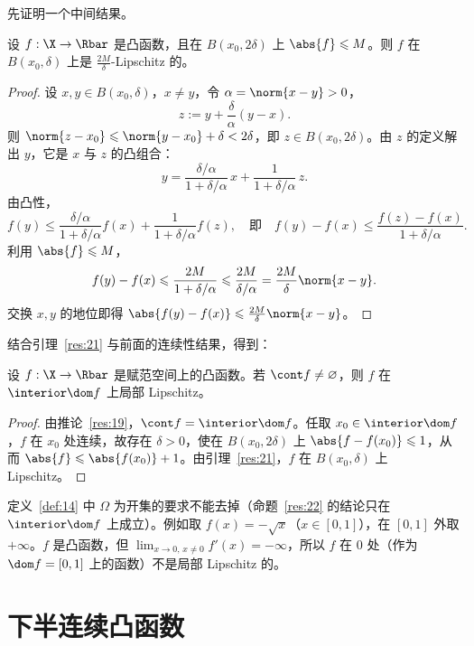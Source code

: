 先证明一个中间结果。

\begin{lemma}
\label{res:21}
设 $f:\X\to\Rbar$ 是凸函数，且在 $B(x_0,2\delta)$ 上 $\abs{f}\leqslant M$。则 $f$ 在 $B(x_0,\delta)$ 上是 $\frac{2M}{\delta}$-Lipschitz 的。
\end{lemma}

\begin{proof}
设 $x,y\in B(x_0,\delta)$，$x\neq y$，令 $\alpha=\norm{x-y}>0$，
\[
  z:=y+\frac{\delta}{\alpha}(y-x).
\]
则 $\norm{z-x_0}\leqslant\norm{y-x_0}+\delta<2\delta$，即 $z\in B(x_0,2\delta)$。由 $z$ 的定义解出 $y$，它是 $x$ 与 $z$ 的凸组合：
\[
  y=\frac{\delta/\alpha}{1+\delta/\alpha}\,x+\frac{1}{1+\delta/\alpha}\,z .
\]
由凸性，
\[
  f(y)\leqslant\frac{\delta/\alpha}{1+\delta/\alpha}f(x)+\frac{1}{1+\delta/\alpha}f(z),
  \quad\text{即}\quad
  f(y)-f(x)\leqslant\frac{f(z)-f(x)}{1+\delta/\alpha}.
\]
利用 $\abs{f}\leqslant M$，
\[
  f(y)-f(x)\leqslant\frac{2M}{1+\delta/\alpha}\leqslant\frac{2M}{\delta/\alpha}=\frac{2M}{\delta}\norm{x-y}.
\]
交换 $x,y$ 的地位即得 $\abs{f(y)-f(x)}\leqslant\frac{2M}{\delta}\norm{x-y}$。
\end{proof}

结合引理~\ref{res:21} 与前面的连续性结果，得到：

\begin{proposition}
\label{res:22}
设 $f:\X\to\Rbar$ 是赋范空间上的凸函数。若 $\cont f\neq\varnothing$，则 $f$ 在 $\interior\dom f$ 上局部 Lipschitz。
\end{proposition}

\begin{proof}
由推论~\ref{res:19}，$\cont f=\interior\dom f$。任取 $x_0\in\interior\dom f$，$f$ 在 $x_0$ 处连续，故存在 $\delta>0$，使在 $B(x_0,2\delta)$ 上 $\abs{f-f(x_0)}\leqslant1$，从而 $\abs{f}\leqslant\abs{f(x_0)}+1$。由引理~\ref{res:21}，$f$ 在 $B(x_0,\delta)$ 上 Lipschitz。
\end{proof}

\begin{remark}
\label{rem:6}
定义~\ref{def:14} 中 $\Omega$ 为开集的要求不能去掉（命题~\ref{res:22} 的结论只在 $\interior\dom f$ 上成立）。例如取
$f(x)=-\sqrt{x}$（$x\in[0,1]$），在 $[0,1]$ 外取 $+\infty$。$f$ 是凸函数，但 $\lim_{x\to0,\,x\neq0}f'(x)=-\infty$，所以 $f$ 在 $0$ 处（作为 $\dom f=[0,1]$ 上的函数）不是局部 Lipschitz 的。
\end{remark}

\section{下半连续凸函数}

